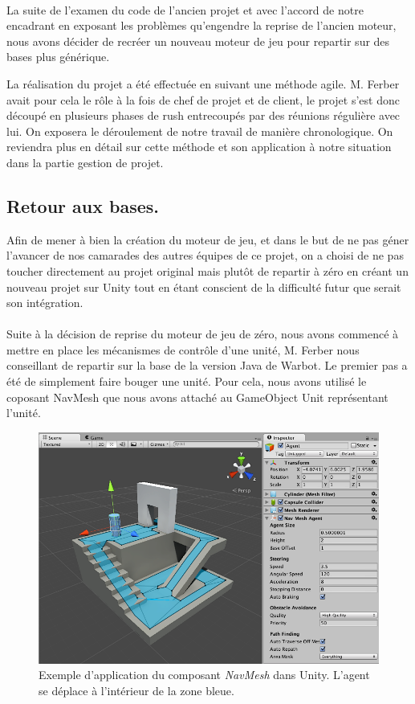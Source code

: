 \documentclass{report}
\begin{document}
\paragraph{} La suite de l'examen du code de l'ancien projet et avec l'accord de notre encadrant en exposant les problèmes qu'engendre la reprise de l'ancien moteur, nous avons décider de recréer un nouveau moteur de jeu pour repartir sur des bases plus générique.


La réalisation du projet a été effectuée en suivant une méthode agile. M. Ferber avait pour cela le rôle à la fois de chef de projet et de client, le projet s'est donc découpé en plusieurs phases de rush entrecoupés par des réunions régulière avec lui. On exposera le déroulement de notre travail de manière chronologique. On reviendra plus en détail sur cette méthode et son application à notre situation dans la partie gestion de projet. 


\subsection{Retour aux bases.}

Afin de mener à bien la création du moteur de jeu, et dans le but de ne pas géner l'avancer de nos camarades des autres équipes de ce projet, on a choisi de ne pas toucher directement au projet original mais plutôt de repartir à zéro en créant un nouveau projet sur Unity tout en étant conscient de la difficulté futur que serait son intégration.

\paragraph{}
Suite à la décision de reprise du moteur de jeu de zéro, nous avons commencé à mettre en place les mécanismes de contrôle d'une unité, M. Ferber nous conseillant de repartir sur la base de la version Java de Warbot. Le premier pas a été de simplement faire bouger une unité. Pour cela, nous avons utilisé le coposant NavMesh que nous avons attaché au GameObject Unit représentant l'unité.

\begin{figure}[h]
\centering
\includegraphics[scale=0.6]{NavMeshImage}
\caption{Exemple d'application du composant \textit{NavMesh} dans Unity. L'agent se déplace à l'intérieur de la zone bleue.}
\end{figure}
\end{document}
